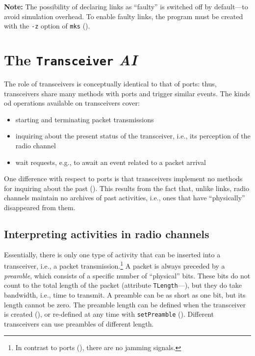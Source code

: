 \medskip

\noindent
{\bf Note:}
The possibility of declaring links as ``faulty'' is switched off by default---to
avoid simulation overhead.
To enable faulty links, the program must be created with the {\tt -z}
option of {\tt mks} ().
\section{The {\tt Transceiver} {\em AI\/}}
\label{rm_tr}

The role of transceivers is conceptually identical to that of ports: thus,
transceivers share many methods with ports and trigger similar events.
The kinds od operations available on transceivers cover:
\begin{itemize}
\item
starting and terminating packet transmissions
\item
inquiring about the present status of the transceiver, i.e., its perception of
the radio channel
\item
wait requests, e.g., to await an event related to a packet arrival
\end{itemize}

One difference with respect to ports is that transceivers implement no methods
for inquiring about the past ().
This results from the fact that, unlike links, radio channels maintain no
archives of past activities, i.e., ones that have ``physically''
disappeared from them.

\subsection{Interpreting activities in radio channels}
\label{rm_tr_ra}

Essentially, there is only one type of activity that can be inserted into
a transceiver, i.e., a packet transmission.\footnote{In contrast to ports
(), there are no jamming signals.}
A packet is always preceded by a {\em preamble}, which consists of a specific
number of ``physical'' bits.
These bits do not count to the total length of the packet (attribute
{\tt TLength}---), but they do take bandwidth, i.e.,
time to transmit.
A preamble can be as short as one bit, but its length cannot be zero.
The preamble length can be defined when the transceiver is created
(), or re-defined at any time with {\tt setPreamble}
().
Different transceivers can use preambles of different length.

